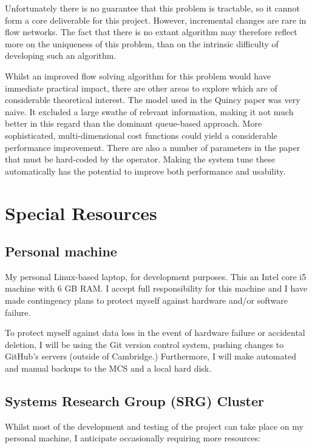 Unfortunately there is no guarantee that this problem is tractable, so it cannot form a core deliverable for this project. However, incremental changes are rare in flow networks. The fact that there is no extant algorithm may therefore reflect more on the uniqueness of this problem, than on the intrinsic difficulty of developing such an algorithm.

Whilst an improved flow solving algorithm for this problem would have immediate practical impact, there are other areas to explore which are of considerable theoretical interest. The model used in the Quincy paper was very naive. It excluded a large swathe of relevant information, making it not much better in this regard than the dominant queue-based approach. More sophisticated, multi-dimensional cost functions could yield a considerable performance improvement. There are also a number of parameters in the paper that must be hard-coded by the operator. Making the system tune these automatically has the potential to improve both performance and usability. 

\section*{Special Resources}
\label{sec:special-resources}

\subsection*{Personal machine}
My personal Linux-based laptop, for development purposes. This an Intel core i5 machine with 6 GB RAM. I accept full responsibility for this machine and I have made contingency plans to protect myself against hardware and/or software failure.

To protect myself against data loss in the event of hardware failure or accidental deletion, I will be using the Git version control system, pushing changes to GitHub's servers (outside of Cambridge.) Furthermore, I will make automated and manual backups to the MCS and a local hard disk.

\subsection*{Systems Research Group (SRG) Cluster}
Whilst most of the development and testing of the project can take place on my personal machine, I anticipate occasionally requiring more resources:

